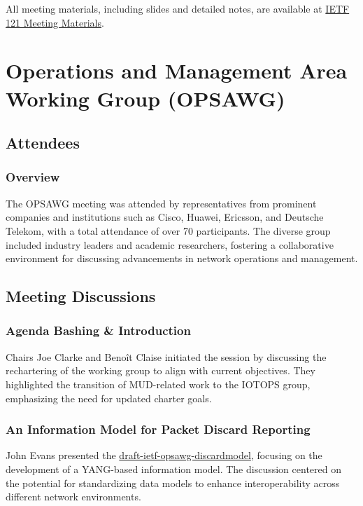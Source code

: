 \documentclass{article}
\begin{document}
All meeting materials, including slides and detailed notes, are available at \href{https://datatracker.ietf.org/meeting/121/materials/}{IETF 121 Meeting Materials}.



\newpage

\section{Operations and Management Area Working Group (OPSAWG)}

\subsection{Attendees}
\subsubsection{Overview}
The OPSAWG meeting was attended by representatives from prominent companies and institutions such as Cisco, Huawei, Ericsson, and Deutsche Telekom, with a total attendance of over 70 participants. The diverse group included industry leaders and academic researchers, fostering a collaborative environment for discussing advancements in network operations and management.

\subsection{Meeting Discussions}

\subsubsection{Agenda Bashing \& Introduction}
Chairs Joe Clarke and Benoît Claise initiated the session by discussing the rechartering of the working group to align with current objectives. They highlighted the transition of MUD-related work to the IOTOPS group, emphasizing the need for updated charter goals.

\subsubsection{An Information Model for Packet Discard Reporting}
John Evans presented the \href{https://datatracker.ietf.org/doc/html/draft-ietf-opsawg-discardmodel}{draft-ietf-opsawg-discardmodel}, focusing on the development of a YANG-based information model. The discussion centered on the potential for standardizing data models to enhance interoperability across different network environments.
\end{document}
